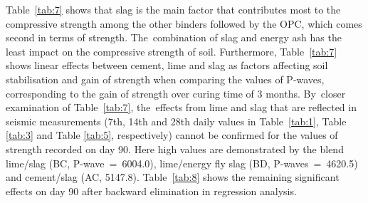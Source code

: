 \documentclass[materials,article,accept,pdftex,moreauthors]{Definitions/mdpi}
\begin{document}
Table~\ref{tab:7} shows that slag is the main factor that contributes most to the compressive strength among the other binders followed by the OPC, which comes second in terms of strength. The~combination of slag and energy ash has the least impact on the compressive strength of soil. Furthermore, Table~\ref{tab:7} shows linear effects between cement, lime and slag as factors affecting soil stabilisation and gain of strength when comparing the values of P-waves, corresponding to the gain of strength over curing time of 3 months. By~closer examination of Table~\ref{tab:7}, the~effects from lime and slag that are reflected in seismic measurements (7th, 14th and 28th daily values in Table~\ref{tab:1}, Table \ref{tab:3} and Table \ref{tab:5}, respectively) cannot be confirmed for the values of strength recorded on day {90}. Here high values are demonstrated by the blend lime/slag (BC, P-wave~=~6004.0), lime/energy fly slag (BD, P-waves~=~4620.5) and cement/slag (AC, 5147.8). Table~\ref{tab:8} shows the remaining significant effects on day {90} after backward elimination in regression analysis.
\end{document}
